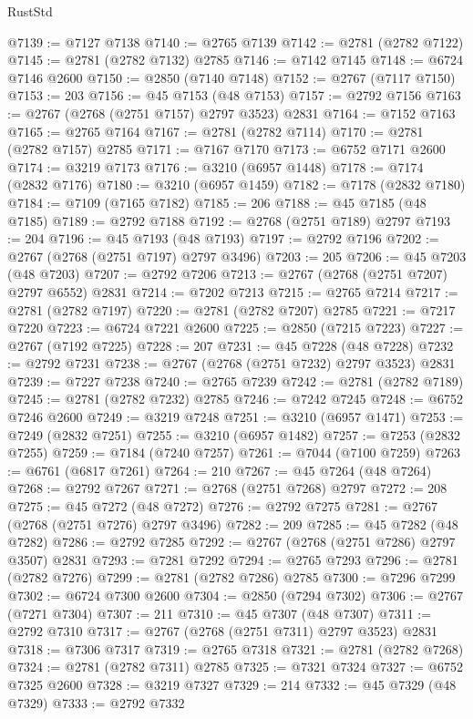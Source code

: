 \begin{lexlean}{RustStd}
\begin{coremodule}
@7139 := @7127 @7138
@7140 := @2765 @7139
@7142 := @2781 (@2782 @7122)
@7145 := @2781 (@2782 @7132) @2785
@7146 := @7142 @7145
@7148 := @6724 @7146 @2600
@7150 := @2850 (@7140 @7148)
@7152 := @2767 (@7117 @7150)
@7153 := 203
@7156 := @45 @7153 (@48 @7153)
@7157 := @2792 @7156
@7163 := @2767 (@2768 (@2751 @7157) @2797 @3523) @2831
@7164 := @7152 @7163
@7165 := @2765 @7164
@7167 := @2781 (@2782 @7114)
@7170 := @2781 (@2782 @7157) @2785
@7171 := @7167 @7170
@7173 := @6752 @7171 @2600
@7174 := @3219 @7173
@7176 := @3210 (@6957 @1448)
@7178 := @7174 (@2832 @7176)
@7180 := @3210 (@6957 @1459)
@7182 := @7178 (@2832 @7180)
@7184 := @7109 (@7165 @7182)
@7185 := 206
@7188 := @45 @7185 (@48 @7185)
@7189 := @2792 @7188
@7192 := @2768 (@2751 @7189) @2797
@7193 := 204
@7196 := @45 @7193 (@48 @7193)
@7197 := @2792 @7196
@7202 := @2767 (@2768 (@2751 @7197) @2797 @3496)
@7203 := 205
@7206 := @45 @7203 (@48 @7203)
@7207 := @2792 @7206
@7213 := @2767 (@2768 (@2751 @7207) @2797 @6552) @2831
@7214 := @7202 @7213
@7215 := @2765 @7214
@7217 := @2781 (@2782 @7197)
@7220 := @2781 (@2782 @7207) @2785
@7221 := @7217 @7220
@7223 := @6724 @7221 @2600
@7225 := @2850 (@7215 @7223)
@7227 := @2767 (@7192 @7225)
@7228 := 207
@7231 := @45 @7228 (@48 @7228)
@7232 := @2792 @7231
@7238 := @2767 (@2768 (@2751 @7232) @2797 @3523) @2831
@7239 := @7227 @7238
@7240 := @2765 @7239
@7242 := @2781 (@2782 @7189)
@7245 := @2781 (@2782 @7232) @2785
@7246 := @7242 @7245
@7248 := @6752 @7246 @2600
@7249 := @3219 @7248
@7251 := @3210 (@6957 @1471)
@7253 := @7249 (@2832 @7251)
@7255 := @3210 (@6957 @1482)
@7257 := @7253 (@2832 @7255)
@7259 := @7184 (@7240 @7257)
@7261 := @7044 (@7100 @7259)
@7263 := @6761 (@6817 @7261)
@7264 := 210
@7267 := @45 @7264 (@48 @7264)
@7268 := @2792 @7267
@7271 := @2768 (@2751 @7268) @2797
@7272 := 208
@7275 := @45 @7272 (@48 @7272)
@7276 := @2792 @7275
@7281 := @2767 (@2768 (@2751 @7276) @2797 @3496)
@7282 := 209
@7285 := @45 @7282 (@48 @7282)
@7286 := @2792 @7285
@7292 := @2767 (@2768 (@2751 @7286) @2797 @3507) @2831
@7293 := @7281 @7292
@7294 := @2765 @7293
@7296 := @2781 (@2782 @7276)
@7299 := @2781 (@2782 @7286) @2785
@7300 := @7296 @7299
@7302 := @6724 @7300 @2600
@7304 := @2850 (@7294 @7302)
@7306 := @2767 (@7271 @7304)
@7307 := 211
@7310 := @45 @7307 (@48 @7307)
@7311 := @2792 @7310
@7317 := @2767 (@2768 (@2751 @7311) @2797 @3523) @2831
@7318 := @7306 @7317
@7319 := @2765 @7318
@7321 := @2781 (@2782 @7268)
@7324 := @2781 (@2782 @7311) @2785
@7325 := @7321 @7324
@7327 := @6752 @7325 @2600
@7328 := @3219 @7327
@7329 := 214
@7332 := @45 @7329 (@48 @7329)
@7333 := @2792 @7332

\end{coremodule}
\end{lexlean}
